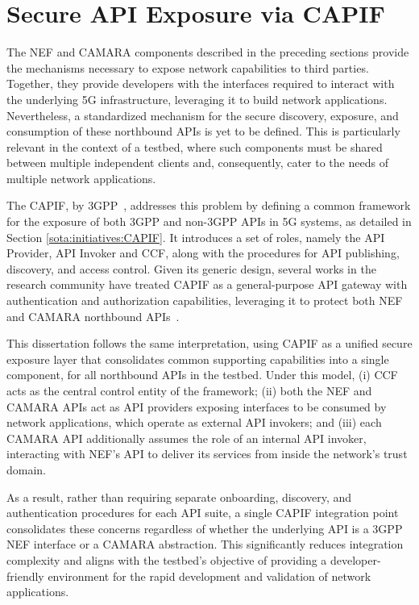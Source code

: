 \section{Secure \acs{API} Exposure via \acs{CAPIF}}
\label{chap:proposal:capif}

The \acs{NEF} and CAMARA components described in the preceding sections provide the mechanisms necessary to expose network capabilities to third parties. Together, they provide developers with the interfaces required to interact with the underlying \acs{5G} infrastructure, leveraging it to build network applications. Nevertheless, a standardized mechanism for the secure discovery, exposure, and consumption of these northbound \acsp{API} is yet to be defined. This is particularly relevant in the context of a testbed, where such components must be shared between multiple independent clients and, consequently, cater to the needs of multiple network applications.

The \acf{CAPIF}, by \acs{3GPP}~\cite{ETSI_CAPIF_TS_123_222_V18_4_0}, addresses this problem by defining a common framework for the exposure of both \acs{3GPP} and non-\acs{3GPP} \acsp{API} in \acs{5G} systems, as detailed in Section \ref{sota:initiatives:CAPIF}. It introduces a set of roles, namely the \acs{API} Provider, \acs{API} Invoker and \acf{CCF}, along with the procedures for \acs{API} publishing, discovery, and access control. Given its generic design, several works in the research community have treated \acs{CAPIF} as a general-purpose \acs{API} gateway with authentication and authorization capabilities, leveraging it to protect both \acs{NEF} and CAMARA northbound \acsp{API}~\citep{PathwayNaaSCAMARA,pushingBoundariesScalable5GCN}.

This dissertation follows the same interpretation, using \acs{CAPIF} as a unified secure exposure layer that consolidates common supporting capabilities into a single component, for all northbound \acsp{API} in the testbed. Under this model, (i) \acs{CCF} acts as the central control entity of the framework; (ii) both the \acs{NEF} and CAMARA \acsp{API} act as \acs{API} providers exposing interfaces to be consumed by network applications, which operate as external API invokers; and (iii) each CAMARA \acs{API} additionally assumes the role of an internal \acs{API} invoker, interacting with \acs{NEF}'s \acs{API} to deliver its services from inside the network's trust domain.

As a result, rather than requiring separate onboarding, discovery, and authentication procedures for each \acs{API} suite, a single \acs{CAPIF} integration point consolidates these concerns regardless of whether the underlying \acs{API} is a \acs{3GPP} \acs{NEF} interface or a CAMARA abstraction. This significantly reduces integration complexity and aligns with the testbed's objective of providing a developer-friendly environment for the rapid development and validation of network applications.
